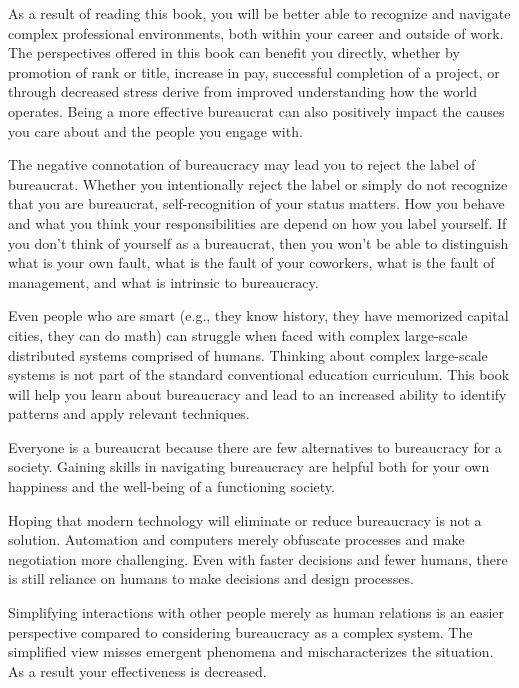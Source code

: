 As a result of reading this book, you will be better able to recognize and navigate complex professional environments, both within your career and outside of work. The perspectives offered in this book can benefit you directly, whether by promotion of rank or title, increase in pay, successful completion of a project, or through decreased stress derive from improved understanding how the world operates. Being a more effective bureaucrat can also positively impact the causes you care about and the people you engage with.

The negative connotation of bureaucracy may lead you to reject the label of bureaucrat. Whether you intentionally reject the label or simply do not recognize that you are bureaucrat, self-recognition of your status matters. How you behave and what you think your responsibilities are depend on how you label yourself.
If you don't think of yourself as a bureaucrat, then you won't be able to distinguish what is your own fault, what is the fault of your coworkers, what is the fault of management, and what is intrinsic to bureaucracy. 


Even people who are smart (e.g., they know history, they have memorized capital cities, they can do math) can struggle when faced with complex large-scale distributed systems comprised of humans. Thinking about complex large-scale systems is not part of the standard conventional education curriculum. This book will help you learn about bureaucracy and lead to an increased ability to identify patterns and apply relevant techniques.

Everyone is a bureaucrat because there are few alternatives to bureaucracy for a society. Gaining skills in navigating bureaucracy are helpful both for your own happiness and the well-being of a functioning society. 

Hoping that modern technology will eliminate or reduce bureaucracy is not a solution. Automation and computers merely obfuscate processes and make negotiation more challenging. Even with faster decisions and fewer humans, there is still reliance on humans to make decisions and design processes.

Simplifying interactions with other people merely as human relations is an easier perspective compared to considering bureaucracy as a complex system.
The simplified view misses emergent phenomena and mischaracterizes the situation. As a result your effectiveness is decreased.



